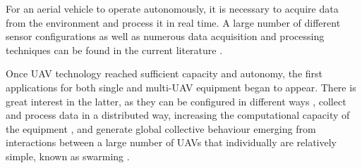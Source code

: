 For an aerial vehicle to operate autonomously, it is necessary to acquire data from the environment and process it in real time. A large number of different sensor configurations as well as numerous data acquisition and processing techniques can be found in the current literature \cite{SenseAndAvoid, aasen2018quantitative, miningSensors}.

Once UAV technology reached sufficient capacity and autonomy, the first applications for both single \cite{nex2014uav, radoglou2020compilation, drummond2015uav} and multi-\gls{UAV} \cite{martinez2007multi, gu2018multiple, scherer2015autonomous} equipment began to appear. There is great interest in the latter, as they can be configured in different ways \cite{multiUAVclassification}, collect and process data in a distributed way, increasing the computational capacity of the equipment \cite{pascarella2015parallel, guo2021coded}, and generate global collective behaviour emerging from interactions between a large number of \glspl{UAV} that individually are relatively simple, known as swarming \cite{zhou2020uav, campion2018uav, chen2020sidr}. 


